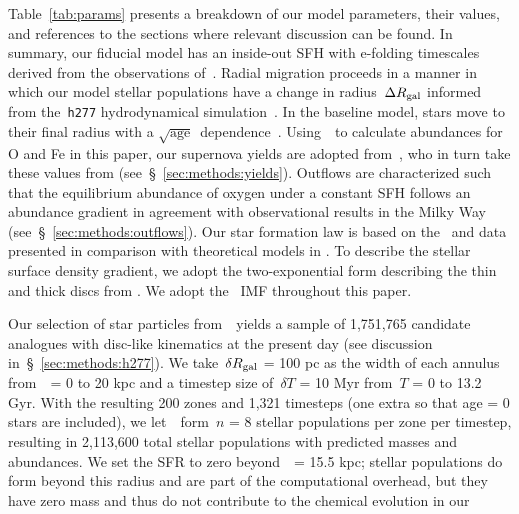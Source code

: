 \documentclass[draft2.tex]{subfiles}
\begin{document}
Table~\ref{tab:params} presents a breakdown of our model parameters, their 
values, and references to the sections where relevant discussion can be found. 
In summary, our fiducial model has an inside-out SFH with e-folding timescales 
derived from the observations of~\citet[][see discussion 
in~\S~\ref{sec:methods:sfhs}]{Sanchez2020}. 
Radial migration proceeds in a manner in which our model stellar populations 
have a change in radius~$\Delta R_\text{gal}$ informed from the~\texttt{h277} 
hydrodynamical simulation~\citep[][see discussion 
in~\S~\ref{sec:methods:h277}]{Christensen2012, Zolotov2012, Loebman2012, 
Loebman2014, Brooks2014}. 
In the baseline model, stars move to their final radius with a 
$\sqrt{\text{age}}$~dependence~\citep[][see discussion in 
\ref{sec:methods:migration}]{Frankel2018,Frankel2020}. 
Using~\vice~to calculate abundances for O and Fe in this paper, our supernova 
yields are adopted from~\citet{Johnson2020}, who in turn take these values from 
\citet{Weinberg2017} (see~\S~\ref{sec:methods:yields}). 
Outflows are characterized such that the equilibrium abundance of oxygen under 
a constant SFH follows an abundance gradient in agreement with observational 
results in the Milky Way (see~\S~\ref{sec:methods:outflows}). 
Our star formation law is based on the~\citet{Bigiel2010} and 
\citet{Leroy2013} data presented in comparison with theoretical models in 
\citet[][see~\S~\ref{sec:methods:sfe}]{Krumholz2018a}. 
To describe the stellar surface density gradient, we adopt the two-exponential 
form describing the thin and thick discs from 
\citet[][see~\S~\ref{sec:methods:surface_density_gradient}]{Bland-Hawthorn2016}. 
We adopt the~\citet{Kroupa2001} IMF throughout this paper. 
\par 
Our selection of star particles from~\hsim~yields a sample of 1,751,765 
candidate analogues with disc-like kinematics at the present day (see 
discussion in~\S~\ref{sec:methods:h277}). 
We take~$\delta R_\text{gal}$ = 100 pc as the width of each annulus from~\rgal~= 0 to 
20 kpc and a timestep size of~$\delta T$ = 10 Myr from~$T$ = 0 to 13.2 Gyr. 
With the resulting 200 zones and 1,321 timesteps (one extra so that age = 0 
stars are included), we let~\vice~form~$n$ = 8 stellar populations per zone per 
timestep, resulting in 2,113,600 total stellar populations with predicted 
masses and abundances. 
We set the SFR to zero beyond~\rgal~= 15.5 kpc; stellar populations 
do form beyond this radius and are part of the computational overhead, but they 
have zero mass and thus do not contribute to the chemical evolution in our 
\end{document}
